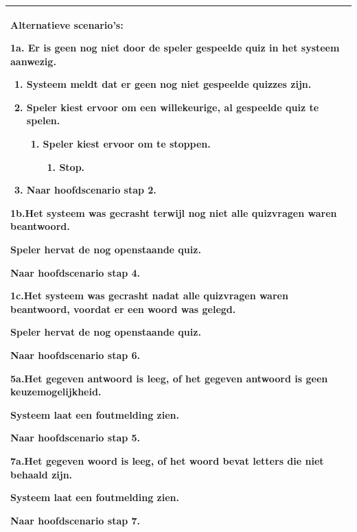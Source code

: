 \begin{xltabular}{\textwidth}{ X }
   \begin{minipage}[t]{\linewidth}
      \textbf{Alternatieve scenario's:}

      1a.\: Er is geen nog niet door de speler gespeelde quiz in het systeem aanwezig.
      \begin{enumerate}[nosep]
         \item Systeem meldt dat er geen nog niet gespeelde quizzes zijn.
         \item Speler kiest ervoor om een willekeurige, al gespeelde quiz te spelen.
               \begin{enumerate}[nosep,label=\theenumi\alph*.]
                  \item Speler kiest ervoor om te stoppen.
                        \begin{enumerate}[nosep,label=\arabic*.]
                           \item Stop.
                        \end{enumerate}
               \end{enumerate}
         \item Naar hoofdscenario stap 2.
      \end{enumerate}
      \bigskip
      1b.\:Het systeem was gecrasht terwijl nog niet alle quizvragen waren beantwoord.
      \begin{smallenumerate}
         \item Speler hervat de nog openstaande quiz.
         \item Naar hoofdscenario stap 4.
      \end{smallenumerate}
      \bigskip
      1c.\:Het systeem was gecrasht nadat alle quizvragen waren beantwoord, voordat er een woord was gelegd.
      \begin{smallenumerate}
         \item Speler hervat de nog openstaande quiz.
         \item Naar hoofdscenario stap 6.
      \end{smallenumerate}
      \bigskip
      5a.\:Het gegeven antwoord is leeg, of het gegeven antwoord is geen keuzemogelijkheid.
      \begin{smallenumerate}
         \item Systeem laat een foutmelding zien.
         \item Naar hoofdscenario stap 5.
      \end{smallenumerate}
      \bigskip
      7a.\:Het gegeven woord is leeg, of het woord bevat letters die niet behaald zijn.
      \begin{smallenumerate}
         \item Systeem laat een foutmelding zien.
         \item Naar hoofdscenario stap 7.
      \end{smallenumerate}
   \end{minipage} \\

   \hline

\end{xltabular}

